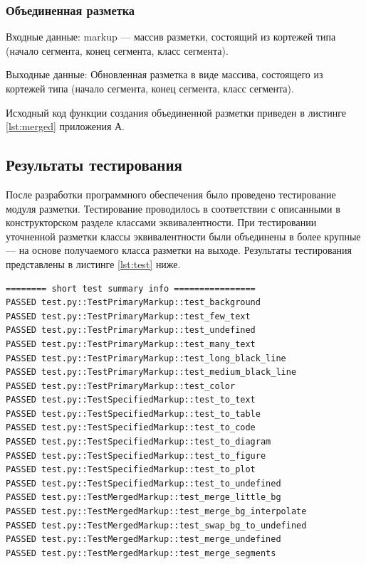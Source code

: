 \subsubsection{Объединенная разметка} %
Входные данные: markup --- массив разметки, состоящий из кортежей типа (начало сегмента, конец сегмента, класс сегмента).

Выходные данные: Обновленная разметка в виде массива, состоящего из кортежей типа (начало сегмента, конец сегмента, класс сегмента).

Исходный код функции создания объединенной разметки приведен в листинге \ref{lst:merged} приложения А.

\subsection{Результаты тестирования}

После разработки программного обеспечения было проведено тестирование модуля разметки.
Тестирование проводилось в соответствии с описанными в конструкторском разделе классами эквивалентности.
При тестировании уточненной разметки классы эквивалентности были объединены в более крупные --- на основе получаемого класса разметки на выходе.
Результаты тестирования представлены в листинге \ref{lst:test} ниже.

\begin{lstlisting}[caption={Результаты тестирования}, label={lst:test}]
======== short test summary info ================
PASSED test.py::TestPrimaryMarkup::test_background
PASSED test.py::TestPrimaryMarkup::test_few_text
PASSED test.py::TestPrimaryMarkup::test_undefined
PASSED test.py::TestPrimaryMarkup::test_many_text
PASSED test.py::TestPrimaryMarkup::test_long_black_line
PASSED test.py::TestPrimaryMarkup::test_medium_black_line
PASSED test.py::TestPrimaryMarkup::test_color
PASSED test.py::TestSpecifiedMarkup::test_to_text
PASSED test.py::TestSpecifiedMarkup::test_to_table
PASSED test.py::TestSpecifiedMarkup::test_to_code
PASSED test.py::TestSpecifiedMarkup::test_to_diagram
PASSED test.py::TestSpecifiedMarkup::test_to_figure
PASSED test.py::TestSpecifiedMarkup::test_to_plot
PASSED test.py::TestSpecifiedMarkup::test_to_undefined
PASSED test.py::TestMergedMarkup::test_merge_little_bg
PASSED test.py::TestMergedMarkup::test_merge_bg_interpolate
PASSED test.py::TestMergedMarkup::test_swap_bg_to_undefined
PASSED test.py::TestMergedMarkup::test_merge_undefined
PASSED test.py::TestMergedMarkup::test_merge_segments
\end{lstlisting}


